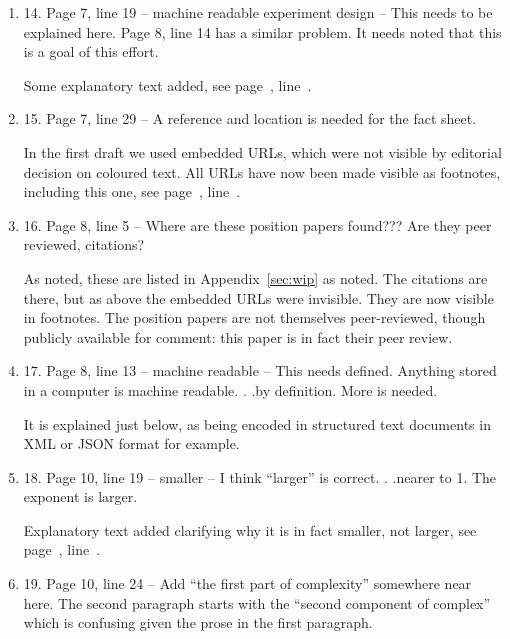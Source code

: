 \documentclass[gmd,manuscript]{copernicus}
\newcommand{\plref}[1]{see page~\pageref{p-#1}, line~\lineref{l-#1}.}
\newenvironment{answer}{\color{blue}}{}
\begin{document}
\begin{enumerate}[label=RC1-\arabic*,leftmargin=*]
  \begin{answer}
    Some explanatory text added, \plref{RC1-13}
  \end{answer}
\item 14. Page 7, line 19 -- machine readable experiment design -- This
  needs to be explained here. Page 8, line 14 has a similar problem.
  It needs noted that this is a goal of this effort.

  \begin{answer}
    Some explanatory text added, \plref{RC1-14}
  \end{answer}
\item 15. Page 7, line 29 -- A reference and location is needed for the
  fact sheet.

  \begin{answer}
    In the first draft we used embedded URLs, which were not visible
    by editorial decision on coloured text. All URLs have now been
    made visible as footnotes, including this one, \plref{RC1-15}
  \end{answer}
\item 16. Page 8, line 5 -- Where are these position papers found???
  Are they peer reviewed, citations?

  \begin{answer}
    As noted, these are listed in Appendix~\ref{sec:wip} as noted. The
    citations are there, but as above the embedded URLs were
    invisible. They are now visible in footnotes. The position papers
    are not themselves peer-reviewed, though publicly available for
    comment: this paper is in fact their peer review.
  \end{answer}
\item 17. Page 8, line 13 -- machine readable -- This needs defined.
  Anything stored in a computer is machine readable. . .by definition.
  More is needed.

  \begin{answer}
    It is explained just below, as being encoded in structured text
    documents in XML or JSON format for example.
  \end{answer}
\item 18. Page 10, line 19 -- smaller -- I think “larger” is correct. .
  .nearer to 1. The exponent is larger.

  \begin{answer}
    Explanatory text added clarifying why it is in fact smaller, not
    larger, \plref{RC1-18}
  \end{answer}
\item 19. Page 10, line 24 -- Add “the first part of complexity”
  somewhere near here. The second paragraph starts with the “second
  component of complex” which is confusing given the prose in the
  first paragraph.


\end{enumerate}
\end{document}
